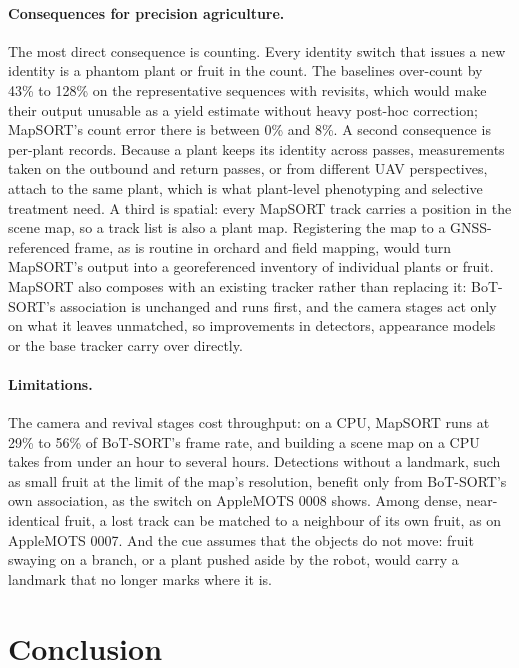 \documentclass[pdflatex,sn-basic]{sn-jnl}%
\theoremstyle{thmstyleone}%
\begin{document}
\paragraph{Consequences for precision agriculture.} The most direct consequence is counting. Every identity switch that issues a new identity is a phantom plant or fruit in the count. The baselines over-count by 43\% to 128\% on the representative sequences with revisits, which would make their output unusable as a yield estimate without heavy post-hoc correction; MapSORT's count error there is between 0\% and 8\%. A second consequence is per-plant records. Because a plant keeps its identity across passes, measurements taken on the outbound and return passes, or from different UAV perspectives, attach to the same plant, which is what plant-level phenotyping and selective treatment need. A third is spatial: every MapSORT track carries a position in the scene map, so a track list is also a plant map. Registering the map to a GNSS-referenced frame, as is routine in orchard and field mapping, would turn MapSORT's output into a georeferenced inventory of individual plants or fruit. MapSORT also composes with an existing tracker rather than replacing it: BoT-SORT's association is unchanged and runs first, and the camera stages act only on what it leaves unmatched, so improvements in detectors, appearance models or the base tracker carry over directly.

\paragraph{Limitations.} The camera and revival stages cost throughput: on a CPU, MapSORT runs at 29\% to 56\% of BoT-SORT's frame rate, and building a scene map on a CPU takes from under an hour to several hours. Detections without a landmark, such as small fruit at the limit of the map's resolution, benefit only from BoT-SORT's own association, as the switch on AppleMOTS 0008 shows. Among dense, near-identical fruit, a lost track can be matched to a neighbour of its own fruit, as on AppleMOTS 0007. And the cue assumes that the objects do not move: fruit swaying on a branch, or a plant pushed aside by the robot, would carry a landmark that no longer marks where it is.

\section{Conclusion}\label{sec:conclusion}
\end{document}
